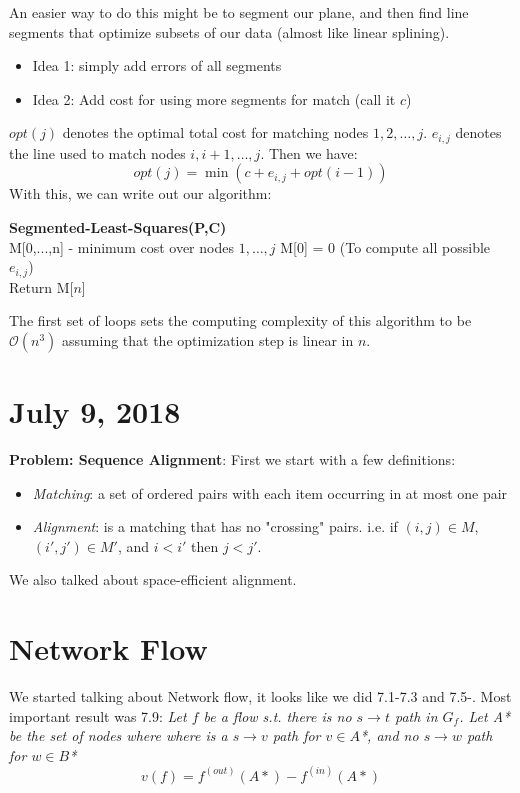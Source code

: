 \documentclass[11pt,letterpaper]{article}
\begin{document}
An easier way to do this might be to segment our plane, and then find line segments that optimize subsets of our data (almost like linear splining). 
\begin{itemize}
	\item Idea 1: simply add errors of all segments
	\item Idea 2: Add cost for using more segments for match (call it $c$)
\end{itemize}

$opt(j)$ denotes the optimal total cost for matching nodes $1, 2, \ldots, j$. $e_{i,j}$ denotes the line used to match nodes $i, i+1, \ldots, j$. Then we have:
$$opt(j) = \min(c + e_{i,j} + opt(i-1))$$
With this, we can write out our algorithm:

\begin{algorithm}[H]
	\textbf{Segmented-Least-Squares(P,C)} \\
	M[0,...,n] - minimum cost over nodes $1,\ldots,j$\;
	M[0] = 0\;
	(To compute all possible $e_{i,j}$) \\ 
	Return M[$n$]
\end{algorithm}
The first set of loops sets the computing complexity of this algorithm to be $\mathcal{O}(n^3)$ assuming that the optimization step is linear in $n$. 

\section{July 9, 2018}
\textbf{Problem: Sequence Alignment}: First we start with a few definitions:
\begin{itemize}
	\item \textit{Matching}: a set of ordered pairs with each item occurring in at most one pair
	\item \textit{Alignment}: is a matching that has no "crossing" pairs. i.e. if $(i,j) \in M$, $(i', j') \in M'$, and $i<i'$ then $j<j'$.
\end{itemize}

We also talked about space-efficient alignment.

\section{Network Flow}
We started talking about Network flow, it looks like we did 7.1-7.3 and 7.5-. Most important result was 7.9: \textit{Let $f$ be a flow s.t. there is no $s\rightarrow t$ path in $G_f$. Let A* be the set of nodes where where is a $s\rightarrow v$ path for $v\in A$*, and no $s\rightarrow w$ path for $w\in B$*} 
$$v(f) = f^{(out)}(A*) - f^{(in)}(A*)$$
\end{document}
